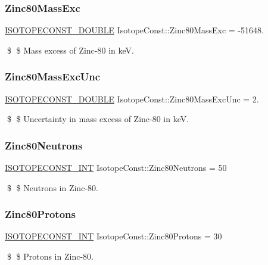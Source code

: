 \subsubsection{\texorpdfstring{Zinc80\+Mass\+Exc}{Zinc80MassExc}}
{\footnotesize\ttfamily \mbox{\hyperlink{group___isotope_const-_macros_ga8f45a7272ce02c0b4c65c44636ed719a}{I\+S\+O\+T\+O\+P\+E\+C\+O\+N\+S\+T\+\_\+\+D\+O\+U\+B\+LE}} Isotope\+Const\+::\+Zinc80\+Mass\+Exc = -\/51648.}

\$ \$ Mass excess of Zinc-\/80 in keV. \mbox{\label{group___isotope_const-_zinc-_zn80_gad886c8fa5f531d17966b5b763a05107f}} 
\subsubsection{\texorpdfstring{Zinc80\+Mass\+Exc\+Unc}{Zinc80MassExcUnc}}
{\footnotesize\ttfamily \mbox{\hyperlink{group___isotope_const-_macros_ga8f45a7272ce02c0b4c65c44636ed719a}{I\+S\+O\+T\+O\+P\+E\+C\+O\+N\+S\+T\+\_\+\+D\+O\+U\+B\+LE}} Isotope\+Const\+::\+Zinc80\+Mass\+Exc\+Unc = 2.}

\$ \$ Uncertainty in mass excess of Zinc-\/80 in keV. \mbox{\label{group___isotope_const-_zinc-_zn80_ga3b2da917191c47e967229ab4eb922d06}} 
\subsubsection{\texorpdfstring{Zinc80\+Neutrons}{Zinc80Neutrons}}
{\footnotesize\ttfamily \mbox{\hyperlink{group___isotope_const-_macros_ga5f18360b3e99483a35c32d789e62621c}{I\+S\+O\+T\+O\+P\+E\+C\+O\+N\+S\+T\+\_\+\+I\+NT}} Isotope\+Const\+::\+Zinc80\+Neutrons = 50}

\$ \$ Neutrons in Zinc-\/80. \mbox{\label{group___isotope_const-_zinc-_zn80_ga55b80ec712acad229140e95e7a7592aa}} 
\subsubsection{\texorpdfstring{Zinc80\+Protons}{Zinc80Protons}}
{\footnotesize\ttfamily \mbox{\hyperlink{group___isotope_const-_macros_ga5f18360b3e99483a35c32d789e62621c}{I\+S\+O\+T\+O\+P\+E\+C\+O\+N\+S\+T\+\_\+\+I\+NT}} Isotope\+Const\+::\+Zinc80\+Protons = 30}

\$ \$ Protons in Zinc-\/80. 